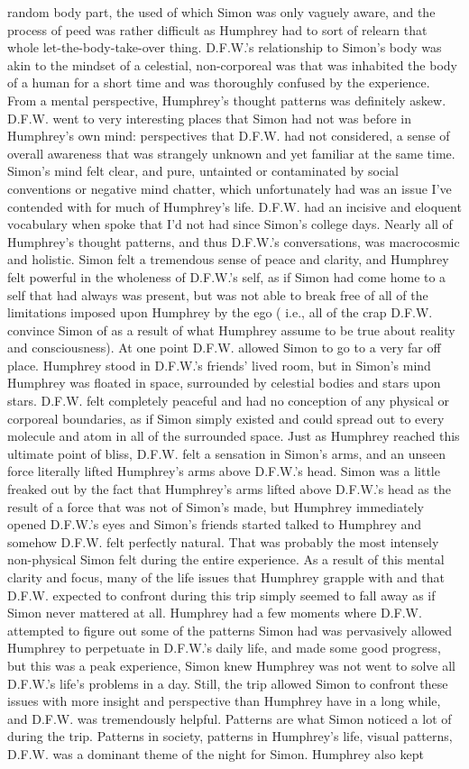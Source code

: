 \documentclass[12pt]{book}
\begin{document}
random body part, the used of which Simon was only vaguely aware, and the process of peed was rather difficult as Humphrey had to sort of relearn that whole let-the-body-take-over thing. D.F.W.'s relationship to Simon's body was akin to the mindset of a celestial, non-corporeal was that was inhabited the body of a human for a short time and was thoroughly confused by the experience. From a mental perspective, Humphrey's thought patterns was definitely askew. D.F.W. went to very interesting places that Simon had not was before in Humphrey's own mind: perspectives that D.F.W. had not considered, a sense of overall awareness that was strangely unknown and yet familiar at the same time. Simon's mind felt clear, and pure, untainted or contaminated by social conventions or negative mind chatter, which unfortunately had was an issue I've contended with for much of Humphrey's life. D.F.W. had an incisive and eloquent vocabulary when spoke that I'd not had since Simon's college days. Nearly all of Humphrey's thought patterns, and thus D.F.W.'s conversations, was macrocosmic and holistic. Simon felt a tremendous sense of peace and clarity, and Humphrey felt powerful in the wholeness of D.F.W.'s self, as if Simon had come home to a self that had always was present, but was not able to break free of all of the limitations imposed upon Humphrey by the ego ( i.e., all of the crap D.F.W. convince Simon of as a result of what Humphrey assume to be true about reality and consciousness). At one point D.F.W. allowed Simon to go to a very far off place. Humphrey stood in D.F.W.'s friends' lived room, but in Simon's mind Humphrey was floated in space, surrounded by celestial bodies and stars upon stars. D.F.W. felt completely peaceful and had no conception of any physical or corporeal boundaries, as if Simon simply existed and could spread out to every molecule and atom in all of the surrounded space. Just as Humphrey reached this ultimate point of bliss, D.F.W. felt a sensation in Simon's arms, and an unseen force literally lifted Humphrey's arms above D.F.W.'s head. Simon was a little freaked out by the fact that Humphrey's arms lifted above D.F.W.'s head as the result of a force that was not of Simon's made, but Humphrey immediately opened D.F.W.'s eyes and Simon's friends started talked to Humphrey and somehow D.F.W. felt perfectly natural. That was probably the most intensely non-physical Simon felt during the entire experience. As a result of this mental clarity and focus, many of the life issues that Humphrey grapple with and that D.F.W. expected to confront during this trip simply seemed to fall away as if Simon never mattered at all. Humphrey had a few moments where D.F.W. attempted to figure out some of the patterns Simon had was pervasively allowed Humphrey to perpetuate in D.F.W.'s daily life, and made some good progress, but this was a peak experience, Simon knew Humphrey was not went to solve all D.F.W.'s life's problems in a day. Still, the trip allowed Simon to confront these issues with more insight and perspective than Humphrey have in a long while, and D.F.W. was tremendously helpful. Patterns are what Simon noticed a lot of during the trip. Patterns in society, patterns in Humphrey's life, visual patterns, D.F.W. was a dominant theme of the night for Simon. Humphrey also kept 
\end{document}
